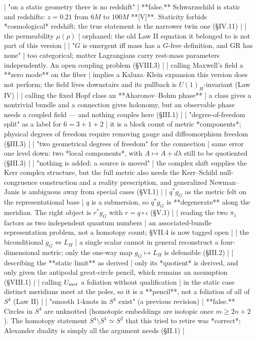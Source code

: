 | "on a static geometry there is no redshift" | **false.** Schwarzschild is static and redshifts: $z = 0.21$ from $6M$ to $100M$ **[V]**. Staticity forbids *cosmological* redshift; the true statement is the narrower twin one (§IV.11) |
| the permeability $\mu(\rho)$ | orphaned: the old Law II equation it belonged to is not part of this version |
| "$G$ is emergent iff mass has a $G$-free definition, and GR has none" | too categorical; matter Lagrangians carry rest-mass parameters independently. An open coupling problem (§VIII.3) |
| calling Maxwell's field a **zero mode** on the fiber | implies a Kaluza–Klein expansion this version does not perform; the field lives downstairs and its pullback is $U(1)_H$-invariant (Law IV) |
| calling the fixed Hopf class an **Aharonov–Bohm phase** | a class gives a nontrivial bundle and a connection gives holonomy, but an observable phase needs a coupled field — and nothing couples here (§III.1) |
| "degree-of-freedom split" as a label for $6 = 3+1+2$ | it is a block count of metric *components*; physical degrees of freedom require removing gauge and diffeomorphism freedom (§III.3) |
| "two geometrical degrees of freedom" for the connection | same error one level down: two *local components*, with $A\mapsto A+d\lambda$ still to be quotiented (§III.3) |
| "nothing is added; a source is moved" | the complex shift supplies the Kerr complex structure, but the full metric also needs the Kerr–Schild null-congruence construction and a reality prescription, and generalized Newman–Janis is ambiguous away from special cases (§VI.1) |
| $q^*g_G$ as the metric felt on the representational base | $q$ is a submersion, so $q^*g_G$ is **degenerate** along the meridian. The right object is $r^*g_G$ with $r = q\circ\iota$ (§V.1) |
| reading the two $\pi_1$ factors as two independent quantum numbers | an associated-bundle representation problem, not a homotopy count; §VII.4 is now tagged open |
| the biconditional $g_G\Leftrightarrow L_H$ | a single scalar cannot in general reconstruct a four-dimensional metric; only the one-way map $g_G\mapsto L_H$ is defensible (§III.2) |
| describing the **static limit** as derived | only its *quotient* is derived, and only given the antipodal great-circle pencil, which remains an assumption (§VIII.1) |
| calling $U_{\rm mer}$ a foliation without qualification | in the static case distinct meridians meet at the poles, so it is a **pencil**, not a foliation of all of $S^4$ (Law II) |
| "smooth 1-knots in $S^4$ exist" (a previous revision) | **false.** Circles in $S^4$ are unknotted (homotopic embeddings are isotopic once $m\geq2n+2$). The homotopy statement $S^4\setminus S^1\simeq S^2$ that this tried to retire was *correct*; Alexander duality is simply all the argument needs (§II.1) |
